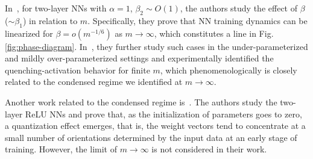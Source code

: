 \documentclass[twoside,11pt]{article}
\begin{document}



In~\cite{e2020comparative}, for two-layer NNs with $\alpha=1$, $\beta_2\sim O(1)$, the authors study the effect of $\beta$ ($\sim \beta_1$) in relation to $m$. Specifically, they prove that NN training dynamics can be linearized for $\beta=o(m^{-1/6})$ as $m\to\infty$, which constitutes a line in Fig. \ref{fig:phase-diagram}. In~\cite{ma2020quenching}, they further study such cases in the under-parameterized and mildly over-parameterized settings and experimentally identified the quenching-activation behavior for finite $m$, which phenomenologically is closely related to the condensed regime we identified at $m\to\infty$.

Another work related to the condensed regime is~\cite{maennel2018gradient}. The authors study the two-layer ReLU NNs and prove that, as the initialization of parameters goes to zero, a quantization effect emerges, that is, the weight vectors tend to concentrate at a small number of orientations determined by the input data at an early stage of training. However, the limit of $m\to \infty$ is not considered in their work.


\end{document}

